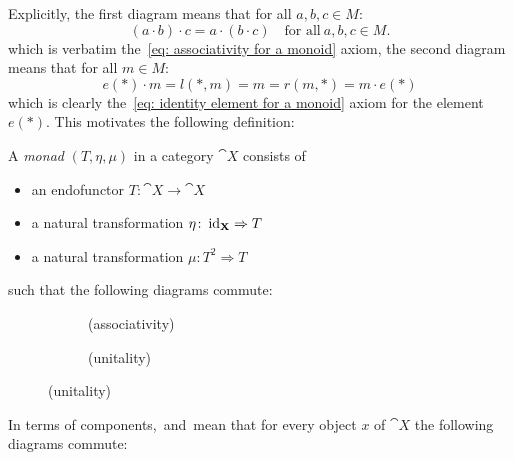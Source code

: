 Explicitly, the first diagram means that for all $a,b,c \in M$:
\[
    (a \cdot b) \cdot c = a \cdot (b \cdot c) 
    \quad \text{for all} \ a,b,c \in M.
\]
which is verbatim the~\ref{eq: associativity for a monoid} axiom, the second diagram means that for all $m \in M$:
\[
  e(\ast) \cdot m = l(\ast,m) = m = r(m,\ast) = m \cdot e(\ast)  
\]
which is clearly the~\ref{eq: identity element for a monoid} axiom 
for the element $e(\ast)$.
This motivates the following definition:
\begin{definition}[monad]
A \textit{monad} $(T,\eta,\mu) $ in a category $\cat{X}$ consists of
\begin{itemize}
    \item an endofunctor $T\colon \cat{X} \to \cat{X}$
    \item a natural transformation $\eta \colon \operatorname{id}_{\mathbf{X}} \Rightarrow T$ 
    \item a natural transformation $\mu\colon T^2 \Rightarrow T $
\end{itemize}  
such that the following diagrams commute:
\begin{figure}[H]
    \centering
    \begin{subfigure}{0.3\textwidth}
        \centering
        \label{dia: associativity}
        \caption*{(associativity)}
    \end{subfigure}
    \hspace{2em}
    \begin{subfigure}{0.3\textwidth}
        \centering
        \label{dia: unitality}
        \caption*{(unitality)}
    \end{subfigure} 
\end{figure}

In terms of components,~ and~ mean that for every object $x$ of $\cat{X}$
the following diagrams commute:


\end{definition}
